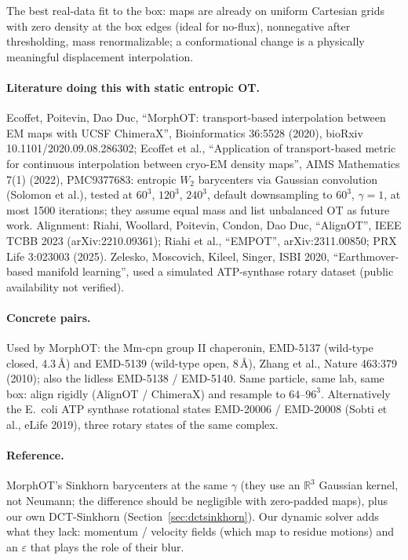 \documentclass[11pt]{article}
\newcommand{\eps}{\varepsilon}
\newcommand{\R}{\mathbb{R}}
\begin{document}
The best real-data fit to the box: maps are already on uniform Cartesian grids with
zero density at the box edges (ideal for no-flux), nonnegative after thresholding,
mass renormalizable; a conformational change is a physically meaningful displacement
interpolation.

\paragraph{Literature doing this with static entropic OT.} Ecoffet, Poitevin, Dao
Duc, ``MorphOT: transport-based interpolation between EM maps with UCSF ChimeraX'',
Bioinformatics 36:5528 (2020), bioRxiv 10.1101/2020.09.08.286302; Ecoffet et al.,
``Application of transport-based metric for continuous interpolation between cryo-EM
density maps'', AIMS Mathematics 7(1) (2022), PMC9377683: entropic $W_2$ barycenters
via Gaussian convolution (Solomon et al.), tested at $60^3$, $120^3$, $240^3$,
default downsampling to $60^3$, $\gamma=1$, at most 1500 iterations; they assume equal
mass and list unbalanced OT as future work. Alignment: Riahi, Woollard, Poitevin,
Condon, Dao Duc, ``AlignOT'', IEEE TCBB 2023 (arXiv:2210.09361); Riahi et al.,
``EMPOT'', arXiv:2311.00850; PRX Life 3:023003 (2025). Zelesko, Moscovich, Kileel,
Singer, ISBI 2020, ``Earthmover-based manifold learning'', used a simulated
ATP-synthase rotary dataset (public availability not verified).

\paragraph{Concrete pairs.} Used by MorphOT: the Mm-cpn group II chaperonin,
EMD-5137 (wild-type closed, 4.3\,\AA) and EMD-5139 (wild-type open, 8\,\AA), Zhang et
al., Nature 463:379 (2010); also the lidless EMD-5138 / EMD-5140. Same particle, same
lab, same box: align rigidly (AlignOT / ChimeraX) and resample to $64$--$96^3$.
Alternatively the E.\ coli ATP synthase rotational states EMD-20006 / EMD-20008
(Sobti et al., eLife 2019), three rotary states of the same complex.

\paragraph{Reference.} MorphOT's Sinkhorn barycenters at the same $\gamma$ (they use
an $\R^3$ Gaussian kernel, not Neumann; the difference should be negligible with
zero-padded maps), plus our own DCT-Sinkhorn (Section~\ref{sec:dctsinkhorn}). Our
dynamic solver adds what they lack: momentum / velocity fields (which map to residue
motions) and an $\eps$ that plays the role of their blur.
\end{document}
